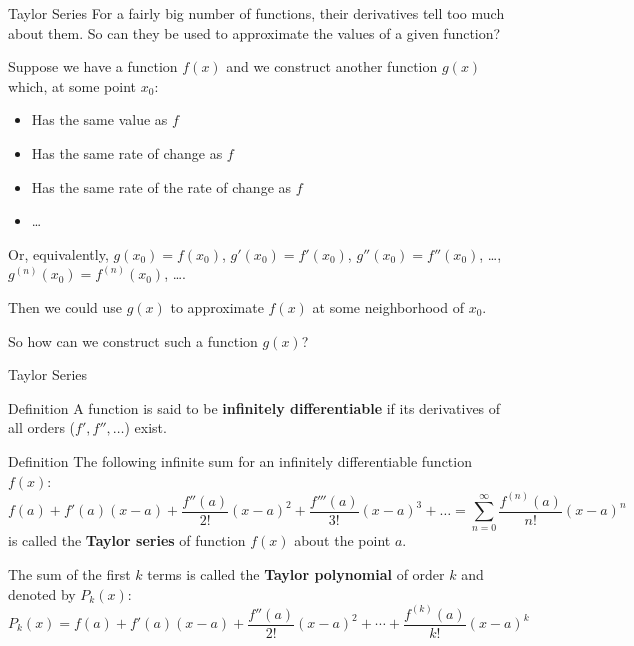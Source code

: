 \documentclass{beamer}
\begin{document}
\begin{frame}{Taylor Series}
    For a fairly big number of functions, their derivatives tell too much about them. So can they be used to approximate the values of a given function? 
    
    \pause Suppose we have a function $f(x)$ and we construct another function $g(x)$ which, at some point $x_0$:\pause
    \begin{itemize}[<+->]
        \item Has the same value as $f$
        \item Has the same rate of change as $f$
        \item Has the same rate of the rate of change as $f$
        \item \dots 
    \end{itemize}
    \pause Or, equivalently, $g(x_0) = f(x_0)$, $g'(x_0) = f'(x_0)$, $g''(x_0) = f''(x_0)$, \dots,  $g^{(n)}(x_0) = f^{(n)}(x_0)$, \dots.

    \pause Then we could use $g(x)$ to approximate $f(x)$ at some neighborhood of $x_0$.

    \pause So how can we construct such a function $g(x)$?
    
\end{frame}



\begin{frame}{Taylor Series}
\begin{block}{Definition}
    A function is said to be \textbf{infinitely differentiable} if its derivatives of all orders ($f', f'', \dots$) exist.
\end{block}\pause
  \begin{block}{Definition}
        The following infinite sum for an infinitely differentiable function $f(x)$:
        \[
        f(a) + f'(a)(x - a) + \frac{f''(a)}{2!}(x - a)^2 + \frac{f'''(a)}{3!}(x - a)^3 + \dots
        = \sum_{n=0}^{\infty} \frac{f^{(n)}(a)}{n!}(x - a)^n
        \]
        is called the \textbf{Taylor series} of function $f(x)$ about the point $a$.
    \end{block}
\pause 
The sum of the first $k$ terms is called the \textbf{Taylor polynomial} of order $k$ and denoted by $P_k (x)$:
\[ P_k(x) = f(a) + f'(a)(x-a) + \frac{f''(a)}{2!}(x-a)^2 + \cdots + \frac{f^{(k)}(a)}{k!}(x-a)^k\]
    
\end{frame}
\end{document}
